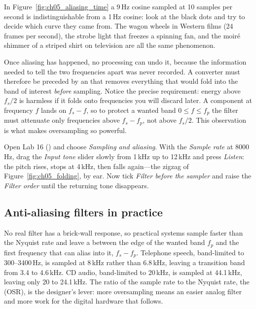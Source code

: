 In Figure~\ref{fig:ch05_aliasing_time} a 9\,Hz cosine sampled at 10 samples per second is
indistinguishable from a 1\,Hz cosine: look at the black dots and try to decide which curve they
came from. The wagon wheels in Western films (24 frames per second), the strobe light that freezes
a spinning fan, and the moir\'e shimmer of a striped shirt on television are all the same
phenomenon.


Once aliasing has happened, no processing can undo it, because the information needed to tell
the two frequencies apart was never recorded. A converter must therefore be preceded by an
 that removes everything that would fold into the band of interest
\emph{before} sampling. Notice the precise requirement: energy above $f_s/2$ is harmless if it
folds onto frequencies you will discard later. A component at frequency $f$ lands on
$f_s-f$, so to protect a wanted band $0\le f\le f_p$ the filter must attenuate only
frequencies above $f_s-f_p$, not above $f_s/2$. This observation is what makes oversampling
so powerful.

\begin{tryit}
Open Lab 16 () and choose \emph{Sampling and aliasing}. With the
\emph{Sample rate} at 8000\,Hz, drag the \emph{Input tone} slider slowly from 1\,kHz up to 12\,kHz
and press \emph{Listen}: the pitch rises, stops at 4\,kHz, then falls again---the zigzag of
Figure~\ref{fig:ch05_folding}, by ear. Now tick \emph{Filter before the sampler} and raise the
\emph{Filter order} until the returning tone disappears.
\end{tryit}

\subsection{Anti-aliasing filters in practice}
\label{sec:ch05:aa}

No real filter has a brick-wall response, so practical systems sample faster than the Nyquist
rate and leave a  between the edge of the wanted band $f_p$ and the
first frequency that can alias into it, $f_s-f_p$. Telephone speech, band-limited to
300--3400\,Hz, is sampled at 8\,kHz rather than 6.8\,kHz, leaving a transition band from 3.4
to 4.6\,kHz. CD audio, band-limited to 20\,kHz, is sampled at 44.1\,kHz, leaving only
20 to 24.1\,kHz. The ratio of the sample rate to the Nyquist rate, the  (OSR), is the designer's lever: more oversampling means an easier analog filter and
more work for the digital hardware that follows.

